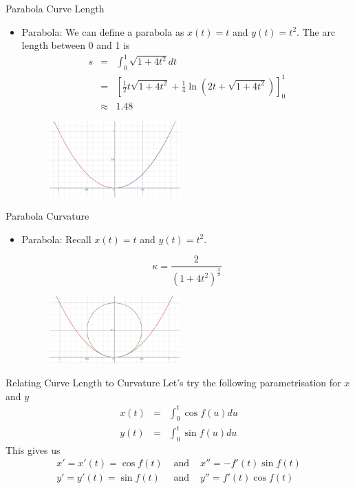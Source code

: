 \documentclass{beamer}
\begin{document}
\begin{frame}{Parabola Curve Length}
	\begin{itemize}	
			
			\item Parabola: We can define a parabola as $x(t)=t$ and $y(t)=t^2$. The arc length between 0 and 1 is 
			\begin{eqnarray*}
				s &=& \int_{0}^{1} \sqrt{1+4t^2}dt \\ &=& \left[\frac{1}{2} t\sqrt{1+ 4 t^2} +\frac{1}{4} \ln \left(2 t+\sqrt{1+ 4 t^2} \right) \right]_{0}^1 \\
				&\approx&	 1.48
			\end{eqnarray*}
		
	\begin{figure}
		\centering
		\includegraphics[width=50mm, scale=0.4]{Parabola_Arc_Length.png}
	\end{figure}
	\end{itemize}
\end{frame}

\begin{frame}{Parabola Curvature}
	\begin{itemize}	
		
		\item Parabola: Recall $x(t)=t$ and $y(t)=t^2$. 
		
		\[
		\kappa = \frac{2}{\left(1 + 4t^2 \right) ^ \frac{3}{2}}
		\]
		
	\begin{figure}
	\centering
	\includegraphics[width=50mm, scale=0.4]{Parabola.png}
\end{figure}

	\end{itemize}
\end{frame}

\begin{frame}{Relating Curve Length to Curvature}
	Let's try the following parametrisation for $x$ and $y$
	\begin{eqnarray*}
		x(t) &=& \int_{0}^{t} \cos f(u) du \\
		y(t) &=& \int_{0}^{t} \sin f(u) du
	\end{eqnarray*}
	This gives us
	\begin{eqnarray*}
		x' = x'(t) = \cos f(t) &\mbox{ and }& x''=-f'(t) \sin f(t) \\
		y' = y'(t) = \sin f(t) &\mbox{ and }& y''=f'(t) \cos f(t)
	\end{eqnarray*}
\end{frame}
\end{document}
